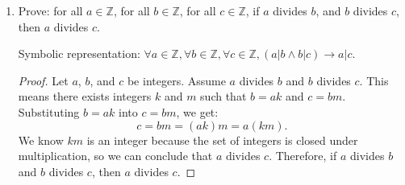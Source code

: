 \documentclass{article}
\newcommand\Z{\mathbb{Z}}
\begin{document}
\begin{enumerate}
\begin{proof}
          \end{proof}

          Proof with symbols:

          \begin{itemize}
              \item Let $j$ be the statement, ``Jax makes jewelrey''.
              \item Let $b$ be the statement, ``Bo bakes cakes''.
              \item Let $k$ be the statement, ``Kofi flies kites''.
              \item Let $a$ be the statement, ``Al likes Archery''.
              \item Let $c$ be the statement, ``Carl goes camping''.
              \item Let $m$ be the statement, ``Matthijs records music''.

          \end{itemize}

          \begin{proof}
              Assume $a$ is true ($\neg a$ is false).

              Using H5, we know that if $b$ is true, then $\neg a$ is true. Since $\neg a$ is
              false, $b$ must be false ($\neg b$ must be true).
              Then, using H2, we know that if $\neg b$ is true, then $j$ is true. Since $\neg
              b$ is true, $j$ must be true.
              Since $j$ is true, we can apply H7 to conclude that $m$ is true.
              By H8, if $k$ were true, it would contradict our previous finding that $m$ is
              true. Therefore, $k$ must be false ($\neg k$ must be true).
              Finally, using H3, we know that if $\neg k$ is true, then $f$ is true. Since
              $\neg k$ is true, $f$ must be true.

          \end{proof}

          \newpage

    \item Prove: for all $a \in \mathbb{Z}$, for all $b \in \mathbb{Z}$, for all $c \in
              \mathbb{Z}$, if $a$ divides $b$, and $b$ divides $c$, then $a$ divides $c$.

              Symbolic representation: $\forall a \in \Z, \forall b \in \Z, \forall c \in \Z, (a|b \land b|c) \rightarrow a|c$.
    
          \begin{proof}
              Let $a$, $b$, and $c$ be integers. Assume $a$ divides $b$ and $b$ divides $c$. This means there exists integers $k$ and $m$ such that $b = ak$ and $c = bm$.
              Substituting $b = ak$ into $c = bm$, we get:
              \[
                c = bm = (ak)m = a(km).
              \]
              We know $km$ is an integer because the set of integers is closed under multiplication, so we can conclude that $a$ divides $c$. Therefore, if $a$ divides $b$ and $b$ divides $c$, then $a$ divides $c$.
          \end{proof}


\end{enumerate}
\end{document}
